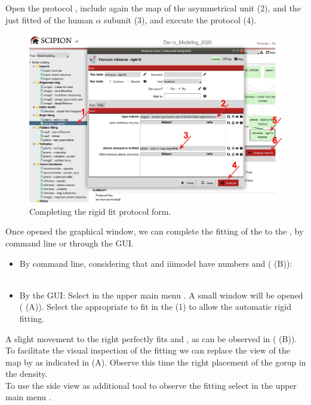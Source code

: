 Open the protocol , include again the map of the asymmetrical unit (2), and the just fitted  of the human  $\alpha$ subunit (3), and execute the protocol (4).
 
 \begin{figure}[H]
  \centering 
  \captionsetup{width=.9\linewidth} 
  \includegraphics[width=1\textwidth]{Images/Fig21}
  \caption{Completing the \chimera rigid fit protocol form.}
  \label{fig:chimera_rigid_fit}
  \end{figure}
  
  Once opened the \chimera graphical window, we can complete the fitting of the  to the , by \chimera command line or through the \chimera GUI. 
    \begin{itemize}
     \item By \chimera command line, considering that  and iii{model} have  numbers  and  ( (B)):\\
            \\
    \item By the \chimera GUI: Select in the upper main menu . A small window will be opened ( (A)). Select the appropriate  to fit in the   (1) to allow the automatic rigid fitting.
    \end{itemize}

  A slight movement to the right perfectly fits  and , as can be observed in ( (B)). To facilitate the visual inspection of the fitting we can replace the  view of the map by  as indicated in (A). Observe this time the right placement of the  gorup in the  density.\\
  To use the side view as additional tool to observe the fitting select in the upper main menu .
  
